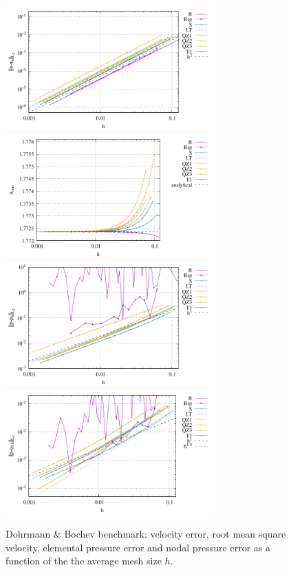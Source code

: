 \documentclass[a4paper]{article}
\begin{document}
\begin{figure}
\centering
\includegraphics[width=8cm]{../results/errors_u_exp9}
\includegraphics[width=8cm]{../results/vrms_exp9} \\
\includegraphics[width=8cm]{../results/errors_p_exp9}
\includegraphics[width=8cm]{../results/errors_q1_exp9}
\caption{Dohrmann \& Bochev benchmark: velocity error, 
root mean square velocity, elemental pressure error and nodal pressure error
as a function of the the average mesh size $h$.} 
\label{fig:resexp7}
\end{figure}
\end{document}
